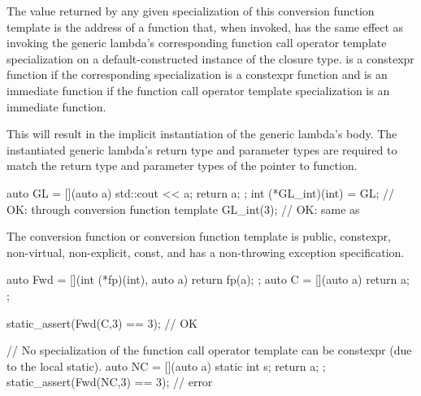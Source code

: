 \pnum
The value returned by any given specialization of this conversion function
template is the address of a function  that, when invoked, has the same
effect as invoking the generic lambda's corresponding function call operator
template specialization on a default-constructed instance of the closure type.
 is a constexpr function
if the corresponding specialization is a constexpr function and
 is an immediate function
if the function call operator template specialization is an immediate function.
\begin{note}
This will result in the implicit instantiation of the generic lambda's body.
The instantiated generic lambda's return type and parameter types are required to match
the return type and parameter types of the pointer to function.
\end{note}
\begin{example}
\begin{codeblock}
auto GL = [](auto a) { std::cout << a; return a; };
int (*GL_int)(int) = GL;        // OK: through conversion function template
GL_int(3);                      // OK: same as 
\end{codeblock}
\end{example}

\pnum
The conversion function or conversion function template is public,
constexpr, non-virtual, non-explicit, const, and has a non-throwing exception
specification.
\begin{example}
\begin{codeblock}
auto Fwd = [](int (*fp)(int), auto a) { return fp(a); };
auto C = [](auto a) { return a; };

static_assert(Fwd(C,3) == 3);   // OK

// No specialization of the function call operator template can be constexpr (due to the local static).
auto NC = [](auto a) { static int s; return a; };
static_assert(Fwd(NC,3) == 3);  // error
\end{codeblock}
\end{example}

